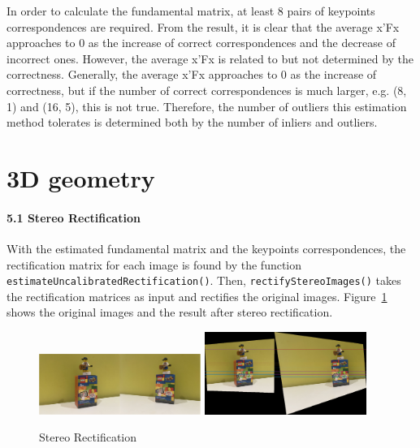 \documentclass[10pt,twocolumn,letterpaper]{article}
\begin{document}
\noindent In order to calculate the fundamental matrix, at least 8 pairs of keypoints correspondences are required. From the result, it is clear that the average x'Fx approaches to 0 as the increase of correct correspondences and the decrease of incorrect ones. However, the average x'Fx is related to but not determined by the correctness. Generally, the average x'Fx approaches to 0 as the increase of correctness, but if the number of correct correspondences is much larger, e.g. (8, 1) and (16, 5), this is not true. Therefore, the number of outliers this estimation method tolerates is determined both by the number of inliers and outliers.




\section{3D geometry}
\paragraph{5.1 Stereo Rectification} 
With the estimated fundamental matrix and the keypoints correspondences, the rectification matrix for each image is found by the function \texttt{\textcolor[RGB]{28,172,0}{estimateUncalibratedRectification()}}. Then, \texttt{\textcolor[RGB]{28,172,0}{rectifyStereoImages()}} takes the rectification matrices as input and rectifies the original images. Figure~\ref{fig:7} shows the original images and the result after stereo rectification.
\begin{figure}[h]
\begin{center}
   \includegraphics[width=0.47\textwidth]{5.10}
   \includegraphics[width=0.47\textwidth]{5.13}
\end{center}
   \caption{Stereo Rectification}
\label{fig:7}
\end{figure}
\end{document}
